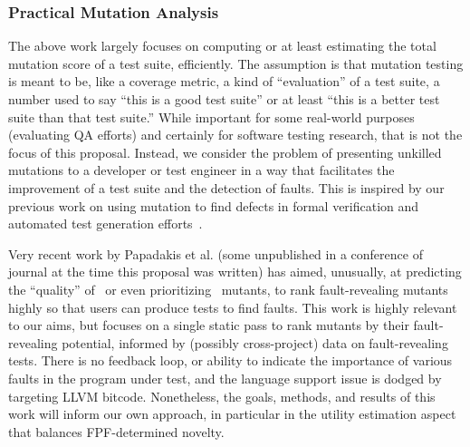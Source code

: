 \subsubsection{Practical Mutation Analysis}

The above work largely focuses on computing or at least estimating the
total mutation score of a
test suite, efficiently.  The assumption is that mutation testing is
meant to be, like a coverage metric, a kind of ``evaluation'' of a
test suite, a number used to say ``this is a good test suite'' or at
least ``this is a better test suite than that test suite.''  While
important for some real-world purposes (evaluating QA efforts) and
certainly for software testing research, that is not the focus of this
proposal.  Instead, we consider the problem of presenting unkilled mutations to
a developer or test engineer in a way that facilitates the improvement
of a test suite and the detection of faults.  This is inspired by our
previous work on using mutation to find defects in formal verification
and automated test generation
efforts~\cite{groce2015verified,groce2018verified,mutKernel}.

Very recent work by Papadakis et al. (some unpublished in a conference
of journal at the time this proposal was written) has 
aimed, unusually, at predicting the ``quality'' of~\cite{MutQuality}
or even prioritizing~\cite{FaRM} mutants, to rank fault-revealing
mutants highly so that users can produce tests to find faults.  This
work is highly relevant to our aims, but focuses on a single static
pass to rank mutants by their fault-revealing potential, informed by
(possibly cross-project)
data on fault-revealing tests.  There is no feedback loop, or ability
to indicate the importance of various faults in the program under
test, and the language support issue is dodged by targeting LLVM
bitcode.  Nonetheless, the goals, methods, and results of this work
will inform our own approach, in particular in the utility estimation
aspect that balances FPF-determined novelty.

